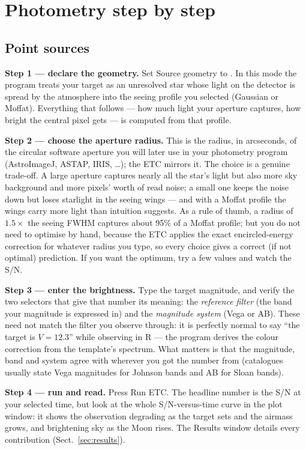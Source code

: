 \section{Photometry step by step}

\subsection{Point sources}

\textbf{Step 1 — declare the geometry.} Set \textsf{Source geometry} to
. In this mode the program treats your target as an
unresolved star whose light on the detector is spread by the atmosphere
into the seeing profile you selected (Gaussian or Moffat). Everything
that follows --- how much light your aperture captures, how bright the
central pixel gets --- is computed from that profile.

\textbf{Step 2 — choose the aperture radius.} This is the radius, in
arcseconds, of the circular software aperture you will later use in your
photometry program (AstroImageJ, ASTAP, IRIS, \dots); the ETC mirrors it.
The choice is a genuine trade-off. A large aperture captures nearly all
the star's light but also more sky background and more pixels' worth of
read noise; a small one keeps the noise down but loses starlight in the
seeing wings --- and with a Moffat profile the wings carry more light
than intuition suggests. As a rule of thumb, a radius of $1.5\times$ the
seeing FWHM captures about 95\% of a Moffat profile; but you do not need
to optimise by hand, because the ETC applies the exact encircled-energy
correction for whatever radius you type, so every choice gives a correct
(if not optimal) prediction. If you want the optimum, try a few values
and watch the S/N.

\textbf{Step 3 — enter the brightness.} Type the target magnitude, and
verify the two selectors that give that number its meaning: the
\emph{reference filter} (the band your magnitude is expressed in) and the
\emph{magnitude system} (Vega or AB). These need not match the filter you
observe through: it is perfectly normal to say ``the target is $V=12.3$''
while observing in R --- the program derives the colour correction from
the template's spectrum. What matters is that the magnitude, band and
system agree with wherever you got the number from (catalogues usually
state Vega magnitudes for Johnson bands and AB for Sloan bands).

\textbf{Step 4 — run and read.} Press \textsf{Run ETC}. The headline
number is the S/N at your selected time, but look at the whole
S/N-versus-time curve in the plot window: it shows the observation
degrading as the target sets and the airmass grows, and brightening sky
as the Moon rises. The Results window details every contribution
(Sect.~\ref{sec:results}).

